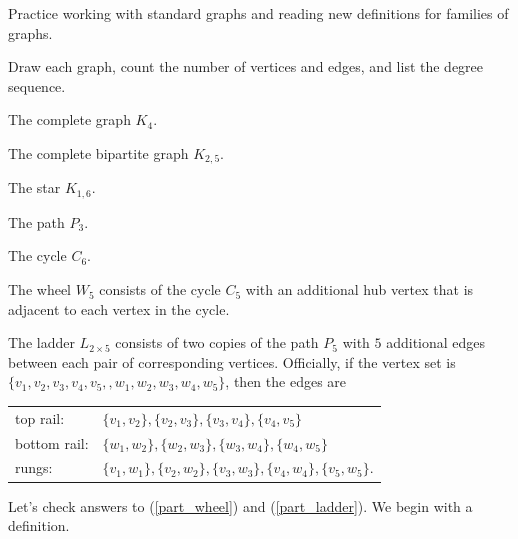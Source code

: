 Practice working with standard graphs and reading new definitions for families of graphs.

\begin{act}
\label{act_std_families}
    Draw each graph, count the number of vertices and edges, and list the degree sequence.  
~
    \begin{apart}
        \item The complete graph $K_4$.       
        \item The complete bipartite graph $K_{2,5}$.
        \item The star $K_{1,6}$.
        \item The path $P_3$.
        \item The cycle $C_6$.
        
        \item \label{part_wheel} The wheel $W_5$ consists of the cycle $C_5$ with an additional hub vertex that is adjacent to each vertex in the cycle. 
        
        \item \label{part_ladder} The ladder $L_{2\times5}$ consists of two copies of the path $P_5$ with $5$ additional edges between each pair of corresponding vertices.  Officially, if the vertex set is $\{v_1,v_2,v_3,v_4,v_5,,w_1,w_2,w_3,w_4,w_5\}$, then the edges are
        
            \begin{center}
            \begin{tabular}{ll}
               top rail: & $\{v_1,v_2\}, \{v_2,v_3\}, \{v_3,v_4\}, \{v_4,v_5\}$ \\
               bottom rail: & $\{w_1,w_2\}, \{w_2,w_3\}, \{w_3,w_4\},\{w_4,w_5\}$ \\
               rungs: & $\{v_1,w_1\}, \{v_2,w_2\}, \{v_3,w_3\},\{v_4,w_4\}, \{v_5,w_5\}.$
            \end{tabular}
            \end{center}
    \end{apart}
\end{act}

Let's check answers to  (\ref{part_wheel}) and (\ref{part_ladder}). We begin with a definition.

